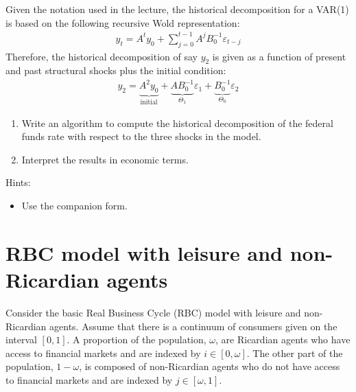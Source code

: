 \documentclass{article}
\begin{document}
Given the notation used in the lecture, the historical decomposition for a VAR{(1)}
  is based on the following recursive Wold representation:
\begin{align*}
y_t = A^t y_0 + \sum_{j=0}^{t-1} A^j B_0^{-1} \varepsilon_{t-j}
\end{align*}
Therefore, the historical decomposition of say \(y_{2}\) is given
  as a function of present and past structural shocks
  plus the initial condition:
\begin{align*}
y_{2} = \underbrace{A^2 y_0}_{\text{initial}} + \underbrace{A B_0^{-1}}_{\Theta_1} \varepsilon_{1} + \underbrace{B_0^{-1}}_{\Theta_0} \varepsilon_{2}
\end{align*}

\begin{enumerate}
\item Write an algorithm to compute the historical decomposition of the federal funds rate with respect to the three shocks in the model.
\item Interpret the results in economic terms.
\end{enumerate}

Hints:
\begin{itemize}
\item Use the companion form.
\end{itemize} 

\newpage

\section{RBC model with leisure and non-Ricardian agents}
Consider the basic Real Business Cycle (RBC) model with leisure and non-Ricardian agents.
Assume that there is a continuum of consumers given on the interval \([0,1]\).
A proportion of the population, \(\omega \), are Ricardian agents
  who have access to financial markets and are indexed by \(i \in [0,\omega]\).
The other part of the population, \(1-\omega \), is composed of non-Ricardian agents
  who do not have access to financial markets and are indexed by \(j \in [\omega,1]\).
\end{document}
